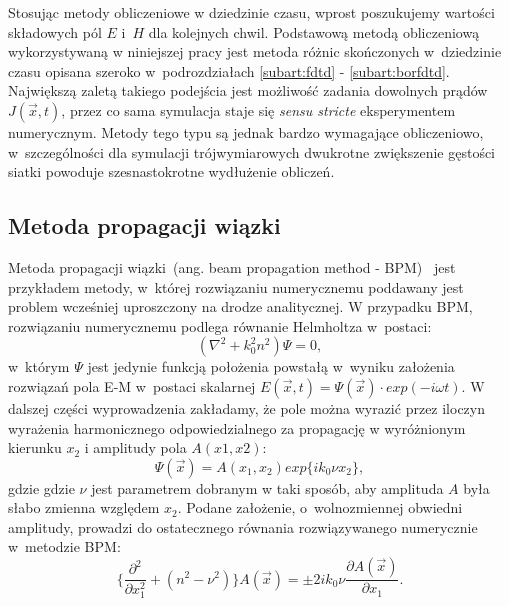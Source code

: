 Stosując metody obliczeniowe w dziedzinie czasu, wprost poszukujemy wartości składowych pól $E$ i~$H$ dla kolejnych chwil. Podstawową metodą obliczeniową wykorzystywaną w niniejszej pracy jest metoda różnic skończonych w~dziedzinie czasu opisana szeroko w~podrozdziałach \ref{subart:fdtd} - \ref{subart:borfdtd}. Największą zaletą takiego podejścia jest możliwość zadania dowolnych prądów $J(\vec{x},t)$, przez co sama symulacja staje się \textit{sensu stricte} eksperymentem numerycznym. Metody tego typu są jednak bardzo wymagające obliczeniowo, w~szczególności dla symulacji trójwymiarowych dwukrotne zwiększenie gęstości siatki powoduje szesnastokrotne wydłużenie obliczeń. 

\subsection{Metoda propagacji wiązki} 

Metoda propagacji wiązki~(ang. beam propagation method - BPM)~\cite{scarmozzino2000numerical,van1981beam} jest przykładem metody, w~której rozwiązaniu numerycznemu poddawany jest problem wcześniej uproszczony na drodze analitycznej. W przypadku BPM, rozwiązaniu numerycznemu podlega równanie Helmholtza w~postaci:
\begin{equation}
 ( \nabla ^2 + k_0^2 n^2 ) \Psi = 0,
\end{equation}
w~którym $\Psi$ jest jedynie funkcją położenia powstałą w~wyniku założenia rozwiązań pola E-M w~postaci skalarnej $E(\vec{x},t)=\Psi(\vec{x})\cdot exp(-i\omega t)$. W dalszej części wyprowadzenia zakładamy, że pole można wyrazić przez iloczyn wyrażenia harmonicznego odpowiedzialnego za propagację w wyróżnionym kierunku $x_2$ i amplitudy pola $A(x1,x2)$:
\begin{equation}
\Psi(\vec{x})=A(x_1,x_2) exp\{ik_0\nu x_2\}, 
\end{equation}
gdzie gdzie $\nu$ jest parametrem dobranym w taki sposób, aby amplituda $A$ była słabo zmienna względem $x_2$. Podane założenie, o~wolnozmiennej obwiedni amplitudy, prowadzi do ostatecznego równania rozwiązywanego numerycznie w~metodzie BPM:
\begin{equation}
 \Big\{  \frac{\partial^2 }{\partial x_1^2 } + (n^2 - \nu^2) \Big\} A(\vec{x}) = \pm  2ik_0\nu \frac{\partial A (\vec{x})}{\partial x_1}.
\end{equation}

